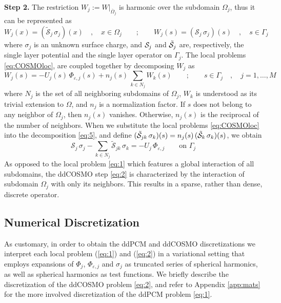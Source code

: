 {\bf Step 2.} The restriction $W_j := W |_{\overline{\Omega}_j}$ is harmonic over the subdomain $\Omega_j$, thus it can be represented as 
\begin{equation}\label{eq:COSMOloc}
W_j(x) = (\tilde{\mathcal{S}}_j \,  \sigma_j) (x) \quad , \quad x \in \Omega_j \qquad ; \qquad
W_j(s) = (\mathcal{S}_j \,  \sigma_j) (s) \quad , \quad s \in \Gamma_j
\end{equation}
where $\sigma_j$ is an unknown surface charge, and $\mathcal{S}_j$ and $\tilde{\mathcal{S}}_j$ are, respectively, the single layer potential and the single layer operator on $\Gamma_j$. The local problems \eqref{eq:COSMOloc}, are coupled together by decomposing $W_j$ as
\begin{equation}\label{eq:5}
W_j(s) = -U_j(s) \, \Phi_{\varepsilon,j}(s) +  n_j(s) \, \sum_{k \in N_j} {W}_k(s) \qquad ; \qquad s \in \Gamma_j \quad , \quad j = 1, \ldots , M
\end{equation}
where $N_j$ is the set of all neighboring subdomains of $\Omega_j$, $W_k$ is understood as its trivial extension to $\Omega$, and $n_j$ is a normalization factor. If $s$ does not belong to any neighbor of $\Omega_j$, then $n_j(s)$ vanishes. Otherwise, $n_j(s)$ is the reciprocal of the number of neighbors. When we substitute the local problems \eqref{eq:COSMOloc} into the decomposition \eqref{eq:5}, and define $(\tilde{\mathcal{S}}_{jk} \, \sigma_k) (s) = n_j(s) \, (\tilde{\mathcal{S}}_k \, \sigma_k)(s)$, we obtain
\begin{equation}\label{eq:2}
\mathcal{S}_j \, \sigma_j  -  \sum_{k \in N_j} \tilde{\mathcal{S}}_{jk} \, \sigma_k = - U_j \, \Phi_{\varepsilon,j} \qquad \text{on } \Gamma_j
\end{equation}
As opposed to the local problem \eqref{eq:1} which features a global interaction of all subdomains, the ddCOSMO step \eqref{eq:2} is characterized by the interaction of subdomain $\Omega_j$ with only its neighbors. This results in a sparse, rather than dense, discrete operator.

\subsection{Numerical Discretization}
As customary, in order to obtain the ddPCM and ddCOSMO discretizations we interpret each local problem (\ref{eq:1}) and (\ref{eq:2}) in a variational setting that employs expansions of $\Phi_j$, $\Phi_{\varepsilon,j}$ and $\sigma_j$ as truncated series of spherical harmonics, as well as spherical harmonics as test functions. We briefly describe the discretization of the ddCOSMO problem \eqref{eq:2}, and refer to Appendix \ref{app:mats} for the more involved discretization of the ddPCM problem \eqref{eq:1}.

